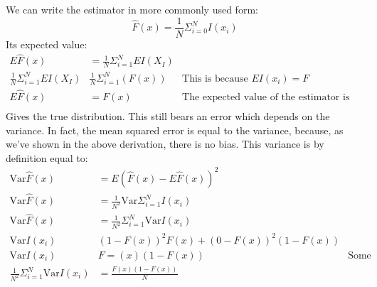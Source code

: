 We can write the estimator in more commonly used form:
\begin{equation}
    \hat{F}(x) = \frac{1}{N}\Sigma^{N}_{i=0}I(x_i)
\end{equation}
Its expected value:
\begin{equation}
    \begin{aligned}
        E\hat{F}(x)&=\frac{1}{N}\Sigma^{N}_{i=1}EI(X_I)&\mbox{}\\[1.25ex]
        \frac{1}{N}\Sigma^{N}_{i=1}EI(X_I)&\frac{1}{N}\Sigma_{i=1}^{N}(F(x))&\mbox{This is because $EI(x_i) = F$}\\[1.25ex]
        E\hat{F}(x)&=F(x)&\mbox{The expected value of the estimator is the true distribution}\\[1.25ex]
    \end{aligned}
\end{equation}
Gives the true distribution. This still bears an error which depends on the variance. In fact, the mean squared error is equal to the variance, because, as we've shown in the above derivation, there is no bias.
This variance is by definition equal to:
\begin{equation}
    \begin{aligned}
    \text{Var}\hat{F}(x) &= E(\hat{F}(x) - E\hat{F}(x))^{2}&\mbox{}\\[1.25ex]
    \text{Var}\hat{F}(x) &= \frac{1}{N^{2}}\text{Var}\Sigma^{N}_{i=1}I(x_i)&\mbox{}\\[1.25ex]
    \text{Var}\hat{F}(x) &=\frac{1}{N^{2}}\Sigma^{N}_{i=1}\text{Var}I(x_i)   &\mbox{}\\[1.25ex]
    \text{Var}I(x_i)&(1-F(x))^{2}F(x) + (0-F(x))^{2}(1-F(x))&\mbox{}\\[1.25ex]
    \text{Var}I(x_i)&F=(x)(1-F(x))&\mbox{Some derivations were skipped}\\[1.25ex]
    \frac{1}{N^{2}}\Sigma^{N}_{i=1}\text{Var}I(x_i)&=\frac{F(x)(1-F(x))}{N} &\mbox{}\\[1.25ex]
    \end{aligned}
\end{equation}




